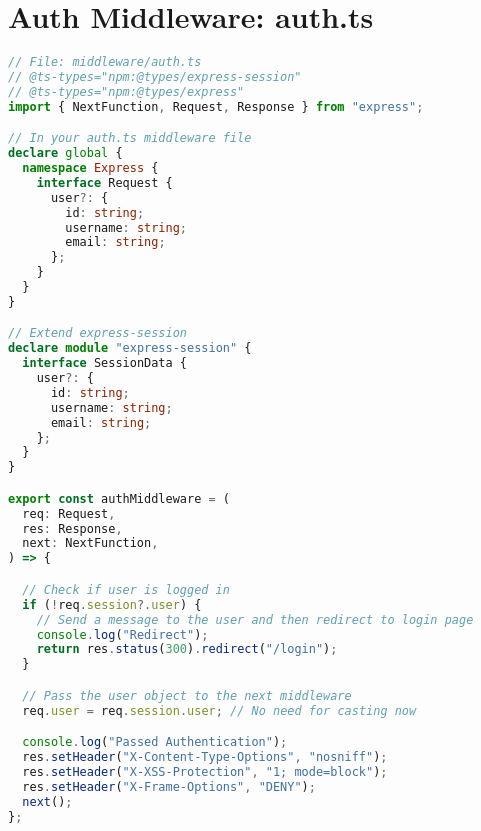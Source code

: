 \section{Auth Middleware: auth.ts}
\begin{lstlisting}[language=TypeScript]
// File: middleware/auth.ts
// @ts-types="npm:@types/express-session"
// @ts-types="npm:@types/express"
import { NextFunction, Request, Response } from "express";

// In your auth.ts middleware file
declare global {
  namespace Express {
    interface Request {
      user?: {
        id: string;
        username: string;
        email: string;
      };
    }
  }
}

// Extend express-session
declare module "express-session" {
  interface SessionData {
    user?: {
      id: string;
      username: string;
      email: string;
    };
  }
}

export const authMiddleware = (
  req: Request,
  res: Response,
  next: NextFunction,
) => {

  // Check if user is logged in
  if (!req.session?.user) {
    // Send a message to the user and then redirect to login page
    console.log("Redirect");
    return res.status(300).redirect("/login");
  }

  // Pass the user object to the next middleware
  req.user = req.session.user; // No need for casting now

  console.log("Passed Authentication");
  res.setHeader("X-Content-Type-Options", "nosniff");
  res.setHeader("X-XSS-Protection", "1; mode=block");
  res.setHeader("X-Frame-Options", "DENY");
  next();
};
\end{lstlisting}

